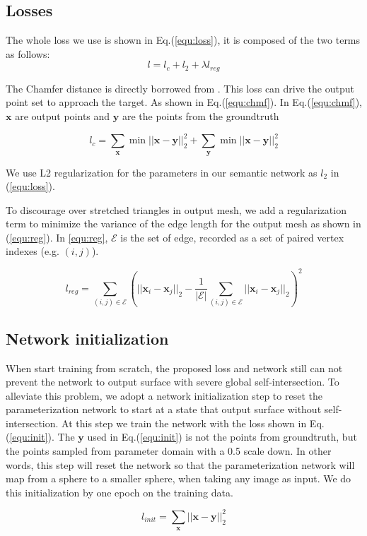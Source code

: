\subsection{Losses}
The whole loss we use is shown in Eq.(\ref{equ:loss}), it is composed of the two terms as follows:
\begin{equation}
\label{equ:loss}
l = l_c + l_2 + \lambda l_{reg} 
\end{equation}

 The Chamfer distance is directly borrowed from \cite{PSGN}. This loss can drive the output point set to approach the target. As shown in Eq.(\ref{equ:chmf}). In Eq.(\ref{equ:chmf}), $\mathbf{x}$ are output points and $\mathbf{y}$ are the points from the groundtruth

\begin{equation}
\label{equ:chmf}
l_c = \sum_\mathbf{x} \min||\mathbf{x}-\mathbf{y}||_2^2+\sum_\mathbf{y} \min||\mathbf{x}-\mathbf{y}||_2^2
\end{equation}

 We use L2 regularization for the parameters in our semantic network as $l_2$ in (\ref{equ:loss}).

 To discourage over stretched triangles in output mesh, we add a regularization term to minimize the variance of the edge length for the output mesh as shown in (\ref{equ:reg}). In \ref{equ:reg}, $\mathcal{E}$ is the set of edge, recorded as a set of paired vertex indexes (e.g. $(i,j)$).

\begin{equation}
\label{equ:reg}
l_{reg} = \sum_{(i,j)\in\mathcal{E}}(||\mathbf{x}_i-\mathbf{x}_j||_2 - \frac{1}{|\mathcal{E}|}\sum_{(i,j)\in\mathcal{E} }||\mathbf{x}_i-\mathbf{x}_j||_2)^2
\end{equation}

\subsection{Network initialization}
When start training from scratch, the proposed loss and network still can not prevent the network to output surface with severe global self-intersection. To alleviate this problem, we adopt a network initialization step to reset the parameterization network to start at a state that output surface without self-intersection. At this step we train the network with the loss shown in Eq.(\ref{equ:init}). The $\mathbf{y}$ used in Eq.(\ref{equ:init}) is not the points from groundtruth, but the points sampled from parameter domain with a 0.5 scale down. In other words, this step will reset the network so that the parameterization network will map from a sphere to a smaller sphere, when taking any image as input. We do this initialization by one epoch on the training data. 

\begin{equation}
\label{equ:init}
l_{init} = \sum_\mathbf{x}||\mathbf{x} - \mathbf{y}||_2^2
\end{equation}


